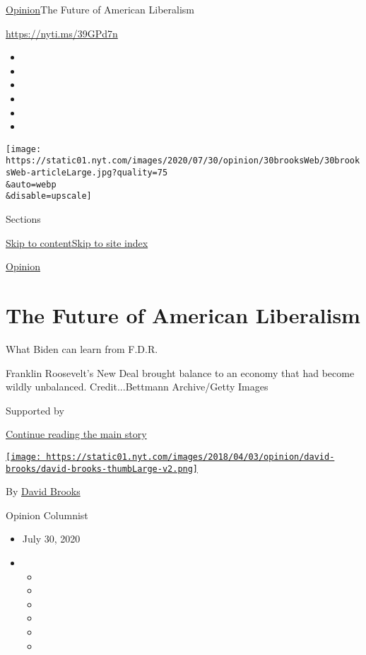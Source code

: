 \href{/section/opinion}{Opinion}\textbar{}The Future of American
Liberalism

\url{https://nyti.ms/39GPd7n}

\begin{itemize}
\item
\item
\item
\item
\item
\item
\end{itemize}

\texttt{[image: https://static01.nyt.com/images/2020/07/30/opinion/30brooksWeb/30brooksWeb-articleLarge.jpg?quality=75\\\&auto=webp\\\&disable=upscale]}

Sections

\protect\hyperlink{site-content}{Skip to
content}\protect\hyperlink{site-index}{Skip to site index}

\href{/section/opinion}{Opinion}

\hypertarget{the-future-of-american-liberalism}{%
\section{The Future of American
Liberalism}\label{the-future-of-american-liberalism}}

What Biden can learn from F.D.R.

Franklin Roosevelt's New Deal brought balance to an economy that had
become wildly unbalanced. Credit...Bettmann Archive/Getty Images

Supported by

\protect\hyperlink{after-sponsor}{Continue reading the main story}

\href{https://www.nytimes.com/by/david-brooks}{\texttt{[image: https://static01.nyt.com/images/2018/04/03/opinion/david-brooks/david-brooks-thumbLarge-v2.png]}}

By \href{https://www.nytimes.com/by/david-brooks}{David Brooks}

Opinion Columnist

\begin{itemize}
\item
  July 30, 2020
\item
  \begin{itemize}
  \item
  \item
  \item
  \item
  \item
  \item
  \end{itemize}
\end{itemize}

